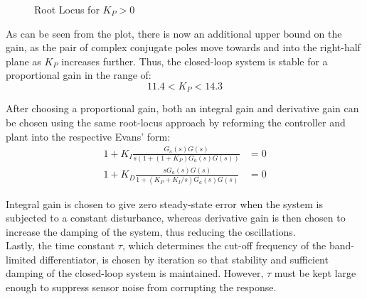 \begin{figure}[H]
	\centering
	\caption{Root Locus for $K_P > 0$}
\end{figure}

As can be seen from the plot, there is now an additional upper bound on the gain, as the pair of complex conjugate poles move towards and into the right-half plane as $K_P$ increases further. Thus, the closed-loop system is stable for a proportional gain in the range of:
\begin{equation*}
11.4 < K_P < 14.3
\end{equation*}

After choosing a proportional gain, both an integral gain and derivative gain can be chosen using the same root-locus approach by reforming the controller and plant into the respective Evans' form:
\begin{align*}
1 + K_I \frac{G_a(s) G(s)}{s (1 + (1 + K_P) G_a(s) G(s))} &= 0 \\
1 + K_D \frac{s G_a(s) G(s)}{1 + (K_P + K_I/s) G_a(s) G(s)} &= 0
\end{align*}

Integral gain is chosen to give zero steady-state error when the system is subjected to a constant disturbance, whereas derivative gain is then chosen to increase the damping of the system, thus reducing the oscillations. \\

Lastly, the time constant $\tau$, which determines the cut-off frequency of the band-limited differentiator, is chosen by iteration so that stability and sufficient damping of the closed-loop system is maintained. However, $\tau$ must be kept large enough to suppress sensor noise from corrupting the response. \\

